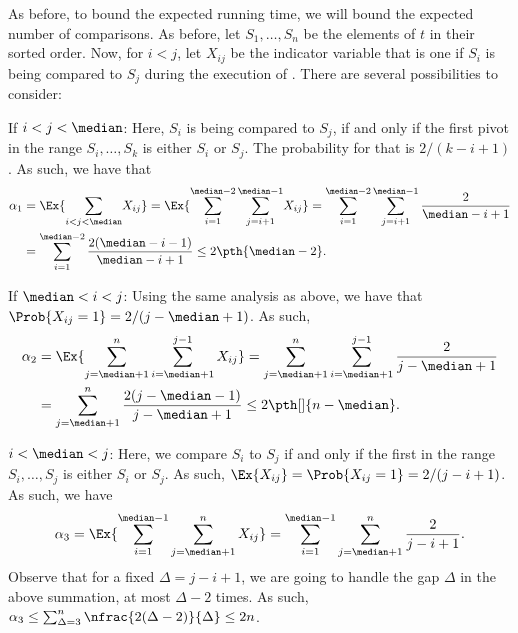 As before, to bound the expected running time, we will bound the
expected number of comparisons. As before, let $S_1, \ldots, S_n$ be
the elements of $t$ in their sorted order.  Now, for $i < j$, let
$X_{ij}$ be the indicator variable that is one if $S_i$ is being
compared to $S_j$ during the execution of \QuickSelect. There are
several possibilities to consider:
\begin{compactenumi}
    \item If $i < j < \median$: Here, $S_i$ is being compared to
    $S_j$, if and only if the first pivot in the range $S_i, \ldots,
    S_k$ is either $S_i$ or $S_j$.  The probability for that is
    $2/(k-i+1)$. As such, we have that
    \begin{align*}
      \alpha_1%
      &=%
        \Ex{\smash{\sum_{i< j <\median}} X_{ij}\Bigr.}%
        =
        \Ex{\biggl. \smash{\sum_{i=1}^{\median-2} \sum_{j=i+1}^{\median-1}} X_{ij}}%
        =%
        \sum_{i=1}^{\median-2} \sum_{j=i+1}^{\median-1}
        \frac{2}{\median-i+1}\\
        &=%
        \sum_{i=1}^{\median-2} \frac{2(\median-i-1)}{\median-i+1}%
        \leq%
        2\pth{\bigl. \median-2}.
    \end{align*}
    
    \item If $\median < i < j$: Using the same analysis as above, we
    have that $\Prob{X_{ij}=1} = 2/(j-\median+1)$. As such,
    \begin{align*}
        \alpha_2
        &= \Ex{\sum_{j=\median+1}^n \sum_{i=\median+1}^{j-1}
           X_{ij}}%
        =%
        \sum_{j=\median+1}^n \sum_{i=\median+1}^{j-1}
        \frac{2}{j-\median+1}\\
        &=%
        \sum_{j=\median+1}^n \frac{2 (j-\median-1)}{j-\median+1}%
        \leq%
        2 \pth[]{\Bigl. n-\median}.
    \end{align*}
    
    \item $i < \median < j$: Here, we compare $S_i$ to $S_j$ if and
    only if the first   in the range $S_i, \ldots, S_j$ is
    either $S_i$ or $S_j$. As such, $\Ex{ X_{ij} } = \Prob{X_{ij}=1} =
    2/(j-i+1)$.  As such, we have
    \begin{align*}
        \alpha_3= \Ex{\sum_{i=1}^{\median-1} \sum_{j=\median+1}^n
           X_{ij}} = \sum_{i=1}^{\median-1} \sum_{j=\median+1}^n
        \frac{2}{j-i+1}.
    \end{align*}
    Observe that for a fixed $\Delta = j-i+1$, we are going to handle
    the gap $\Delta$ in the above summation, at most $\Delta-2$
    times. As such, $\alpha_3 \leq \sum_{\Delta=3}^{n} \nfrac{2
       (\Delta-2)}{\Delta} \leq 2 n$.
    

\end{compactenumi}
